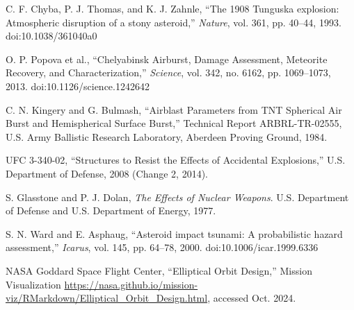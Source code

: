 \documentclass[conference]{IEEEtran}
\begin{document}
\begin{thebibliography}{00}
	C. F. Chyba, P. J. Thomas, and K. J. Zahnle, ``The 1908 Tunguska explosion: Atmospheric disruption of a stony asteroid,'' \textit{Nature}, vol. 361, pp. 40--44, 1993. doi:10.1038/361040a0

	O. P. Popova et al., ``Chelyabinsk Airburst, Damage Assessment, Meteorite Recovery, and Characterization,'' \textit{Science}, vol. 342, no. 6162, pp. 1069--1073, 2013. doi:10.1126/science.1242642

	C. N. Kingery and G. Bulmash, ``Airblast Parameters from TNT Spherical Air Burst and Hemispherical Surface Burst,'' Technical Report ARBRL-TR-02555, U.S. Army Ballistic Research Laboratory, Aberdeen Proving Ground, 1984.

	UFC 3-340-02, ``Structures to Resist the Effects of Accidental Explosions,'' U.S. Department of Defense, 2008 (Change 2, 2014).

	S. Glasstone and P. J. Dolan, \textit{The Effects of Nuclear Weapons}. U.S. Department of Defense and U.S. Department of Energy, 1977.

	S. N. Ward and E. Asphaug, ``Asteroid impact tsunami: A probabilistic hazard assessment,'' \textit{Icarus}, vol. 145, pp. 64--78, 2000. doi:10.1006/icar.1999.6336

	NASA Goddard Space Flight Center, ``Elliptical Orbit Design,'' Mission Visualization \url{https://nasa.github.io/mission-viz/RMarkdown/Elliptical_Orbit_Design.html}, accessed Oct. 2024.

\end{thebibliography}
\end{document}
